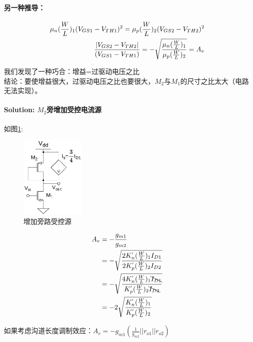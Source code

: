 \documentclass[twoside,a4paper,openright,titlepage,draft]{ctexrep}
\begin{document}
\paragraph{另一种推导：}
\begin{align}
    \mu_n(\frac{W}{L})_1(V_{GS1}-V_{TH1})^2 = \mu_p(\frac{W}{L})_2(V_{GS2}-V_{TH2})^2 \notag \\
    \frac{|V_{GS2}-V_{TH2}|}{(V_{GS1}-V_{TH1})} = 
    -\sqrt{\frac{\mu_n (\frac{W}{L})_1}{\mu_p (\frac{W}{L})_2}} = A_v
\end{align}
\par
我们发现了一种巧合：增益=过驱动电压之比 \\

结论：要使增益很大，过驱动电压之比也要很大，$M_2$与$M_1$的尺寸之比太大（电路无法实现）。\\

\paragraph{Solution: $M_2$旁增加受控电流源\\}
如图\ref{fig:增加旁路受控源}:

\begin{multicols}{2}
    \begin{figure}[H]
        \centering
        \includegraphics[height=40mm]{diode-connectedbypass.eps}
        \caption{增加旁路受控源}
        \label{fig:增加旁路受控源}
    \end{figure}
    \columnbreak
    \begin{align}
        A_v &= -\frac{g_{m1}}{g_{m2}} \notag \\
        &= -\sqrt{\frac{2K^{'}_n(\frac{W}{L})_1I_{D1}}{2K^{'}_p(\frac{W}{L})_2I_{D2}}} \notag \\
        &= -\sqrt{\frac{4K^{'}_n(\frac{W}{L})_1\bcancel{I_{D1}}}{K^{'}_p(\frac{W}{L})_2\bcancel{I_{D2}}}}\notag\\
        &= -2\sqrt{\frac{K^{'}_n(\frac{W}{L})_1}{K^{'}_p(\frac{W}{L})_2}}
    \end{align} 
\end{multicols}
如果考虑沟道长度调制效应：$A_v = -g_{m1}(\frac{1}{g_{m2}}||r_{o1}||r_{o2})$
\end{document}
